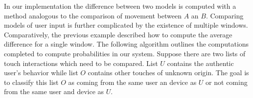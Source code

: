 In our implementation
the difference between two models is computed with a
method analogous to the comparison of movement between $A$ an $B$.
%
Comparing models of user input 
is further complicated by the existence of
multiple windows.
Comparatively, the previous example described how
to compute the average difference for a single window.
%
The following algorithm outlines
the computations completed to compute probabilities in our system.
Suppose there are two lists of touch interactions which need to 
be compared.
List $U$ contains the authentic user's behavior while
list $O$ contains other touches of unknown origin.
The goal is to classify this list $O$ as 
coming from the same user an device as $U$ or
not coming from the same user and device as $U$.
